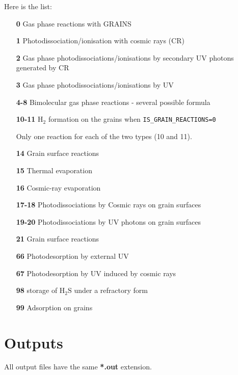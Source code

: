 \documentclass[english,a4paper,twoside]{article}
\newcommand{\molecule}[1]{\ensuremath{\mathrm{#1}}}
\begin{document}
Here is the list:
\begin{itemize}
\item[\textbf{0}] Gas phase reactions with GRAINS
\item[\textbf{1}] Photodissociation/ionisation with cosmic rays (CR)
\item[\textbf{2}] Gas phase photodissociations/ionisations by secondary UV photons generated by CR
\item[\textbf{3}] Gas phase photodissociations/ionisations by UV
\item[\textbf{4-8}] Bimolecular gas phase reactions - several possible formula 
\item[\textbf{10-11}] \molecule{H_2} formation on the grains when \verb|IS_GRAIN_REACTIONS=0|
\begin{remarque}
Only one reaction for each of the two types (10 and 11).
\end{remarque}
\item[\textbf{14}] Grain surface reactions
\item[\textbf{15}] Thermal evaporation
\item[\textbf{16}] Cosmic-ray evaporation
\item[\textbf{17-18}] Photodissociations by Cosmic rays on grain surfaces
\item[\textbf{19-20}] Photodissociations by UV photons on grain surfaces
\item[\textbf{21}] Grain surface reactions
\item[\textbf{66}] Photodesorption by external UV
\item[\textbf{67}] Photodesorption by UV induced by cosmic rays
\item[\textbf{98}] storage of $\molecule{H_2S}$ under a refractory form
\item[\textbf{99}] Adsorption on grains
\end{itemize}

\section{Outputs}
\begin{attention}
All output files have the same \textbf{*.out} extension.
\end{attention}
\end{document}
